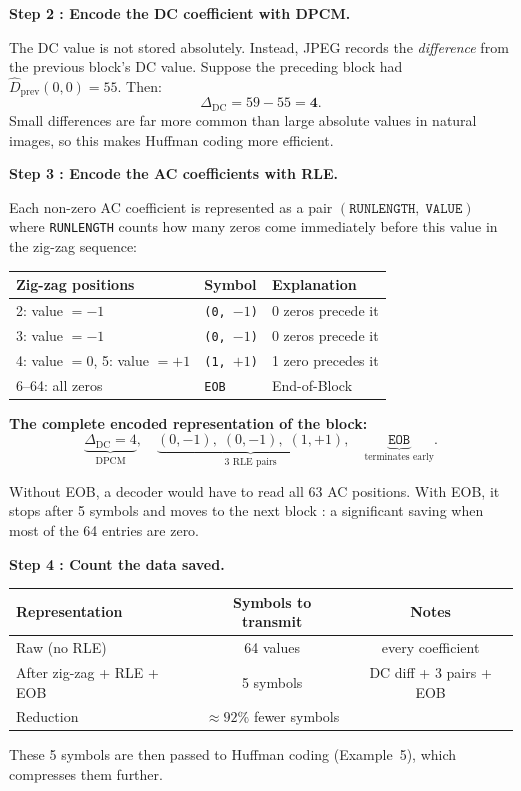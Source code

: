 \begin{examplebox}
\medskip
\noindent\textbf{Step 2 : Encode the DC coefficient with DPCM.}

The DC value is not stored absolutely. Instead, JPEG records the
\emph{difference} from the previous block's DC value. Suppose the
preceding block had $\hat{D}_{\text{prev}}(0,0)=55$. Then:
\[
  \Delta_{\text{DC}} = 59 - 55 = \mathbf{4}.
\]
Small differences are far more common than large absolute values in natural
images, so this makes Huffman coding more efficient.

\medskip
\noindent\textbf{Step 3 : Encode the AC coefficients with RLE.}

Each non-zero AC coefficient is represented as a pair
$(\texttt{RUNLENGTH},\;\texttt{VALUE})$ where \texttt{RUNLENGTH} counts how
many zeros come immediately before this value in the zig-zag sequence:

\begin{center}
\setlength{\tabcolsep}{10pt}
\begin{tabular}{lll}
\toprule
Zig-zag positions & Symbol & Explanation \\
\midrule
2: value $=-1$  & \texttt{(0, $-1$)} & 0 zeros precede it \\
3: value $=-1$  & \texttt{(0, $-1$)} & 0 zeros precede it \\
4: value $=0$, 5: value $=+1$ & \texttt{(1, $+1$)} & 1 zero precedes it \\
6--64: all zeros & \texttt{EOB}       & End-of-Block \\
\bottomrule
\end{tabular}
\end{center}

\noindent\textbf{The complete encoded representation of the block:}
\[
  \underbrace{\Delta_{\text{DC}}=4}_{\text{DPCM}},\quad
  \underbrace{(0,-1),\;(0,-1),\;(1,+1)}_{\text{3 RLE pairs}},\quad
  \underbrace{\texttt{EOB}}_{\text{terminates early}}.
\]

Without EOB, a decoder would have to read all 63 AC positions.  With EOB,
it stops after 5 symbols and moves to the next block : a significant saving
when most of the 64 entries are zero.

\medskip
\noindent\textbf{Step 4 : Count the data saved.}

\begin{center}
\setlength{\tabcolsep}{6pt}
\begin{tabular}{lcc}
\toprule
Representation & Symbols to transmit & Notes \\
\midrule
Raw (no RLE) & 64 values & every coefficient \\
After zig-zag + RLE + EOB & 5 symbols & DC diff + 3 pairs + EOB \\
\midrule
Reduction & $\approx 92\%$ fewer symbols & \\
\bottomrule
\end{tabular}
\end{center}

These 5 symbols are then passed to Huffman coding (Example~5), which
compresses them further.
\end{examplebox}

